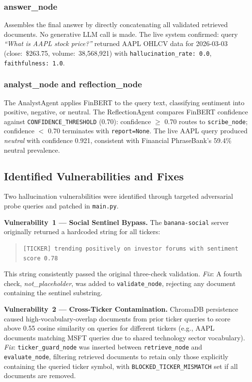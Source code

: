 \documentclass[10pt,twocolumn]{article}
\newcommand{\node}[1]{\texttt{#1}}
\begin{document}
\subsubsection{answer\_node}
Assembles the final answer by directly concatenating all validated
retrieved documents.
No generative LLM call is made.
The live system confirmed: query \emph{``What is AAPL stock price?''}
returned AAPL OHLCV data for 2026-03-03 (close:~\$263.75,
volume:~38,568,921) with
\texttt{hallucination\_rate:~0.0}, \texttt{faithfulness:~1.0}.

\subsubsection{analyst\_node and reflection\_node}
The AnalystAgent applies FinBERT to the query text, classifying
sentiment into positive, negative, or neutral.
The ReflectionAgent compares FinBERT confidence against
\texttt{CONFIDENCE\_THRESHOLD} (0.70):
confidence $\geq$ 0.70 routes to \node{scribe\_node};
confidence $<$ 0.70 terminates with \texttt{report=None}.
The live AAPL query produced \emph{neutral} with confidence 0.921,
consistent with Financial PhraseBank's 59.4\% neutral prevalence.

\subsection{Identified Vulnerabilities and Fixes}

Two hallucination vulnerabilities were identified through targeted
adversarial probe queries and patched in \texttt{main.py}.

\textbf{Vulnerability~1 --- Social Sentinel Bypass.}
The \node{banana-social} server originally returned a hardcoded string
for all tickers:
\begin{quote}
\texttt{\small [TICKER] trending positively on investor forums with
sentiment score 0.78}
\end{quote}
This string consistently passed the original three-check validation.
\textit{Fix}: A fourth check, \textit{not\_placeholder}, was added to
\node{validate\_node}, rejecting any document containing the sentinel
substring.

\textbf{Vulnerability~2 --- Cross-Ticker Contamination.}
ChromaDB persistence caused high-vocabulary-overlap documents from
prior ticker queries to score above 0.55 cosine similarity on queries
for different tickers (e.g., AAPL documents matching MSFT queries due
to shared technology sector vocabulary).
\textit{Fix}: \node{ticker\_guard\_node} was inserted between
\node{retrieve\_node} and \node{evaluate\_node}, filtering retrieved
documents to retain only those explicitly containing the queried ticker
symbol, with \texttt{BLOCKED\_TICKER\_MISMATCH} set if all documents
are removed.
\end{document}
